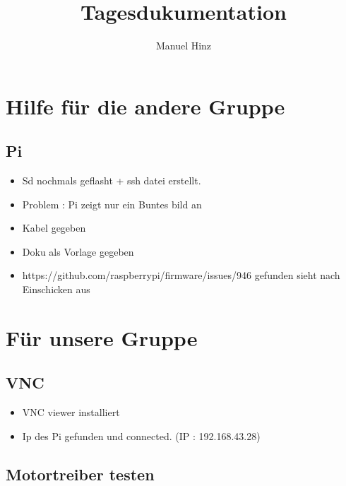 \documentclass{article}
\title{Tagesdukumentation}
\author{Manuel Hinz}
\begin{document}
\maketitle

\section{Hilfe f\"{u}r die andere Gruppe}

\subsection{Pi}

\begin{itemize}

\item Sd nochmals geflasht + ssh datei erstellt.

\item Problem : Pi zeigt nur ein Buntes bild an 

\item Kabel gegeben 

\item Doku als Vorlage gegeben

\item https://github.com/raspberrypi/firmware/issues/946 gefunden sieht nach Einschicken aus

\end{itemize}

\section{F\"{u}r unsere Gruppe}

\subsection{VNC}

\begin{itemize}

\item VNC viewer installiert

\item Ip des Pi gefunden und connected. (IP : 192.168.43.28) 

\end{itemize}

\subsection{Motortreiber testen}
\end{document}
